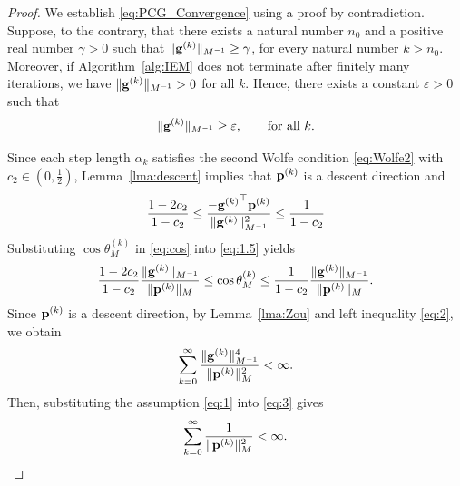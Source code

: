 \documentclass[11pt,a4paper]{article}
\begin{document}
\begin{proof}
We establish \eqref{eq:PCG_Convergence} using a proof by contradiction.
Suppose, to the contrary, that there exists a natural number $n_0$ and a positive real number $\gamma > 0$ such that $\| \mathbf{g}^{(k)} \|_{M^{-1}} \geq \gamma$, for every natural number $k>n_0$. 
Moreover, if Algorithm~\ref{alg:IEM} does not terminate after finitely many iterations, we have $\| \mathbf{g}^{(k)} \|_{M^{-1}}  > 0 $ for all $k$. Hence, there exists a constant $\varepsilon > 0$ such that 
\begin{equation}
\| \mathbf{g}^{(k)} \|_{M^{-1}} \geq \varepsilon, \qquad \mbox{for all }k.
\label{eq:1}
\end{equation}


Since each step length $\alpha_k$ satisfies the second Wolfe condition \eqref{eq:Wolfe2} with $c_2 \in (0, \tfrac{1}{2})$, Lemma~\ref{lma:descent} implies that $\mathbf{p}^{(k)}$ is a descent direction and 
\begin{equation}
\frac{1-2c_2}{1-c_2}  \leq \frac{-{\mathbf{g}^{(k)}}^{\top} \mathbf{p}^{(k)}}{\| \mathbf{g}^{(k)} \|^2_{M^{-1}}} \leq \frac{1}{1 - c_2}
\label{eq:1.5}
\end{equation}
Substituting $\cos \theta_M^{(k)}$ in \eqref{eq:cos} into \eqref{eq:1.5} yields
\begin{equation} \label{eq:2}
\frac{1-2c_2}{1-c_2} \frac{\|\mathbf{g}^{(k)}\|_{M^{-1}}}{\|\mathbf{p}^{(k)}\|_M} \leq \cos \theta_M^{(k)} \leq  \frac{1}{1 - c_2} \frac{\|\mathbf{g}^{(k)}\|_{M^{-1}}}{\|\mathbf{p}^{(k)}\|_M}. 
\end{equation}
Since $\mathbf{p}^{(k)}$ is a descent direction, by Lemma~\ref{lma:Zou} and left inequality \eqref{eq:2}, we obtain
\begin{align}
\sum_{k=0}^{\infty}  \frac{\| \mathbf{g}^{(k)} \|^4_{M^{-1}}}{\| \mathbf{p}^{(k)} \|^2_{M}} < \infty.  \label{eq:3}
\end{align}
Then, substituting the assumption \eqref{eq:1} into \eqref{eq:3} gives
\begin{equation}
\sum_{k=0}^{\infty}  \frac{1}{\| \mathbf{p}^{(k)} \|^2_{M}} < \infty. \label{eq:4}
\end{equation}



\end{proof}
\end{document}
